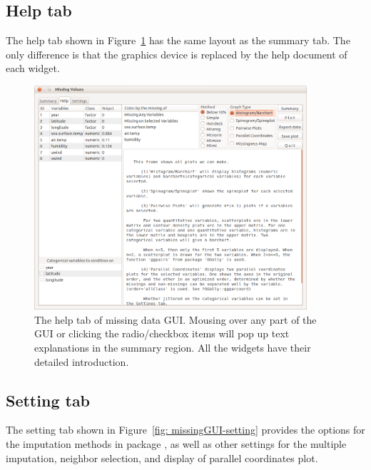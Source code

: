 \documentclass[article]{jss}
\begin{document}
\subsection{Help tab}

The help tab shown in Figure~\ref{fig: missingGUI-help} has the same layout as the summary tab. The only difference is that the graphics device is replaced by the help document of each widget.

\begin{center}
\begin{figure}[h]
\begin{centering}
\includegraphics[width=0.9\textwidth]{graph/fig1-GUI-tab2}
\par\end{centering}
\caption{The help tab of missing data GUI. Mousing over any part of the GUI or clicking the radio/checkbox items will pop up text explanations in the summary region. All the widgets have their detailed introduction.}
\label{fig: missingGUI-help}
\end{figure}
\par\end{center}


\subsection{Setting tab}

The setting tab shown in Figure~\ref{fig: missingGUI-setting} provides the options 
for the imputation methods in package , as well as other settings for 
the multiple imputation, neighbor selection, and display of parallel coordinates plot.
\end{document}
